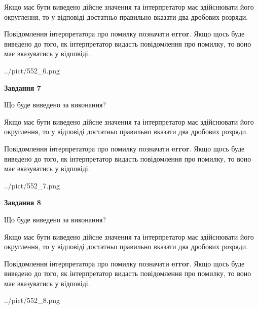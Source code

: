 \documentclass[12pt, ukrainian]{article}
\begin{document}
{\begin {Large}
Якщо має бути виведено дійсне значення та інтерпретатор має здійснювати його округлення, 
то у відповіді достатньо правильно вказати два дробових розряди.

Повідомлення інтерпретатора про помилку позначати \textbf{error}.
Якщо щось буде виведено до того, як інтерпретатор видасть повідомлення про помилку, 
то воно має вказуватись у відповіді. \par

\begin{center}
	{../pict/552_6.png}
\end{center}
\newpage

{\begin {center}\textbf{Завдання 7}\end {center}}\par
Що буде виведено за виконання? \par

Якщо має бути виведено дійсне значення та інтерпретатор має здійснювати його округлення, 
то у відповіді достатньо правильно вказати два дробових розряди.

Повідомлення інтерпретатора про помилку позначати \textbf{error}.
Якщо щось буде виведено до того, як інтерпретатор видасть повідомлення про помилку, 
то воно має вказуватись у відповіді. \par

\begin{center}
	{../pict/552_7.png}
\end{center}
\newpage

{\begin {center}\textbf{Завдання 8}\end {center}}\par
Що буде виведено за виконання? \par

Якщо має бути виведено дійсне значення та інтерпретатор має здійснювати його округлення, 
то у відповіді достатньо правильно вказати два дробових розряди.

Повідомлення інтерпретатора про помилку позначати \textbf{error}.
Якщо щось буде виведено до того, як інтерпретатор видасть повідомлення про помилку, 
то воно має вказуватись у відповіді. \par

\begin{center}
	{../pict/552_8.png}
\end{center}
\newpage


\end{Large}}
\end{document}

